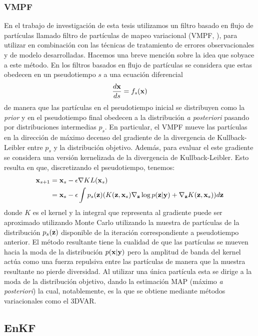 \subsubsection{VMPF}

En el trabajo de investigación de esta tesis utilizamos un filtro basado en flujo de partículas llamado filtro de partículas de mapeo variacional (VMPF, \cite{Pulido2019}), para utilizar en combinación con las técnicas de tratamiento de errores observacionales y de modelo desarrolladas. Hacemos una breve mención sobre la idea que sobyace a este método. En los filtros basados en flujo de partículas se considera que estas obedecen en un pseudotiempo $s$ a una ecuación diferencial
\begin{align*}
    \frac{d\mathbf{x}}{ds} = f_s(\mathbf{x})
\end{align*}
de manera que las partículas en el pseudotiempo inicial se distribuyen como la \textit{prior} y en el pseudotiempo final obedecen a la distribución \textit{a posteriori} pasando por distribuciones intermedias $p_s$. En particular, el VMPF mueve las partículas en la dirección de máximo decenso del gradiente de la divergencia de Kullback-Leibler entre $p_s$ y la distribución objetivo. Además, para evaluar el este gradiente se considera una versión kernelizada de la divergencia de Kullback-Leibler. Esto resulta en que, discretizando el pseudotiempo, tenemos:
\begin{align*}
    \mathbf{x}_{s+1} &= \mathbf{x}_s - \epsilon \nabla KL(\mathbf{x}_s) \\
    &= \mathbf{x}_s - \epsilon \int p_s(\mathbf{z}) (K(\mathbf{z}, \mathbf{x}_s) \nabla_{\mathbf{z}} \log p(\mathbf{z} | \mathbf{y}) + \nabla_{\mathbf{z}} K(\mathbf{z}, \mathbf{x}_s)) d\mathbf{z}
\end{align*}
donde $K$ es el kernel y la integral que representa al gradiente puede ser aproximado utilizando Monte Carlo utilizando la muestra de partículas de la distribución $p_s(\mathbf{z})$ disponible de la iteración correspondiente a pseudotiempo anterior. El método resultante tiene la cualidad de que las partículas se mueven hacia la moda de la distribución $p(\mathbf{x} | \mathbf{y})$ pero la amplitud de banda del kernel actúa como una fuerza repulsiva entre las partículas \citep{Liu2016} de manera que la muestra resultante no pierde diversidad. Al utilizar una única partícula esta se dirige a la moda de la distribución objetivo, dando la estimación MAP (máximo \textit{a posteriori}) la cual, notablemente, es la que se obtiene mediante métodos variacionales como el 3DVAR.

\subsection{EnKF} \label{sec:enkf}

